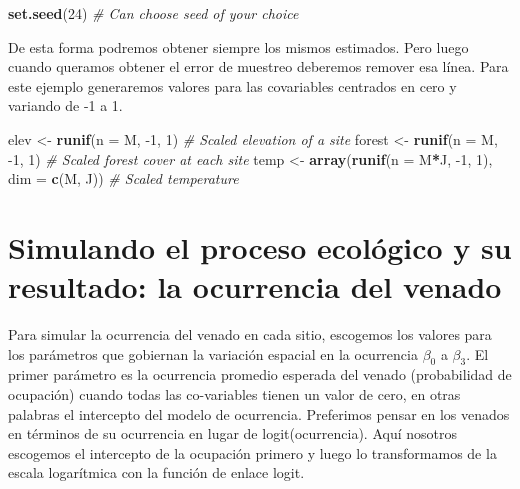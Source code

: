 \documentclass[
]{book}
\newenvironment{Shaded}{\begin{snugshade}}{\end{snugshade}}
\newcommand{\CommentTok}[1]{\textcolor[rgb]{0.56,0.35,0.01}{\textit{#1}}}
\newcommand{\DataTypeTok}[1]{\textcolor[rgb]{0.13,0.29,0.53}{#1}}
\newcommand{\DecValTok}[1]{\textcolor[rgb]{0.00,0.00,0.81}{#1}}
\newcommand{\KeywordTok}[1]{\textcolor[rgb]{0.13,0.29,0.53}{\textbf{#1}}}
\newcommand{\NormalTok}[1]{#1}
\newcommand{\OperatorTok}[1]{\textcolor[rgb]{0.81,0.36,0.00}{\textbf{#1}}}
\newcommand{\StringTok}[1]{\textcolor[rgb]{0.31,0.60,0.02}{#1}}
\begin{document}
\begin{Shaded}
\begin{Highlighting}[]
\KeywordTok{set.seed}\NormalTok{(}\DecValTok{24}\NormalTok{) }\CommentTok{# Can choose seed of your choice}
\end{Highlighting}
\end{Shaded}

De esta forma podremos obtener siempre los mismos estimados. Pero luego cuando queramos obtener el error de muestreo deberemos remover esa línea. Para este ejemplo generaremos valores para las covariables centrados en cero y variando de -1 a 1.

\begin{Shaded}
\begin{Highlighting}[]
\NormalTok{elev <-}\StringTok{ }\KeywordTok{runif}\NormalTok{(}\DataTypeTok{n =}\NormalTok{ M, }\DecValTok{-1}\NormalTok{, }\DecValTok{1}\NormalTok{)             }\CommentTok{# Scaled elevation of a site}
\NormalTok{forest <-}\StringTok{ }\KeywordTok{runif}\NormalTok{(}\DataTypeTok{n =}\NormalTok{ M, }\DecValTok{-1}\NormalTok{, }\DecValTok{1}\NormalTok{)           }\CommentTok{# Scaled forest cover at each site}
\NormalTok{temp <-}\StringTok{ }\KeywordTok{array}\NormalTok{(}\KeywordTok{runif}\NormalTok{(}\DataTypeTok{n =}\NormalTok{ M}\OperatorTok{*}\NormalTok{J, }\DecValTok{-1}\NormalTok{, }\DecValTok{1}\NormalTok{), }\DataTypeTok{dim =} \KeywordTok{c}\NormalTok{(M, J)) }\CommentTok{# Scaled temperature}
\end{Highlighting}
\end{Shaded}

\hypertarget{simulando-el-proceso-ecoluxf3gico-y-su-resultado-la-ocurrencia-del-venado}{%
\section{Simulando el proceso ecológico y su resultado: la ocurrencia del venado}\label{simulando-el-proceso-ecoluxf3gico-y-su-resultado-la-ocurrencia-del-venado}}

Para simular la ocurrencia del venado en cada sitio, escogemos los valores para los parámetros que gobiernan la variación espacial en la ocurrencia \(\beta _{0}\) a \(\beta _{3}\). El primer parámetro es la ocurrencia promedio esperada del venado (probabilidad de ocupación) cuando todas las co-variables tienen un valor de cero, en otras palabras el intercepto del modelo de ocurrencia. Preferimos pensar en los venados en términos de su ocurrencia en lugar de logit(ocurrencia). Aquí nosotros escogemos el intercepto de la ocupación primero y luego lo transformamos de la escala logarítmica con la función de enlace logit.
\end{document}
